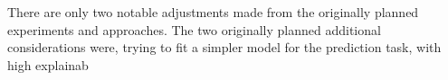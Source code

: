 There are only two notable adjustments made from the originally planned experiments and approaches. The two originally planned additional considerations were, trying to fit a simpler model for the prediction task, with high explainab